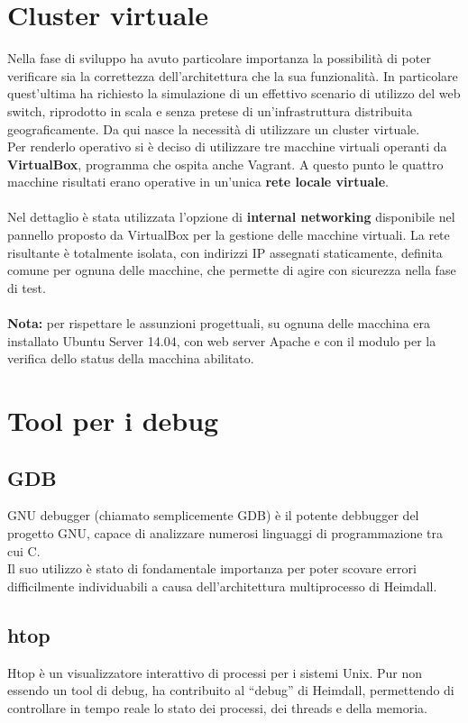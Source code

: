 \documentclass[italian]{tktltiki2}
\begin{document}
\section{Cluster virtuale}
Nella fase di sviluppo ha avuto particolare importanza la possibilità di poter verificare sia la correttezza dell'architettura che la sua funzionalità. In particolare quest'ultima ha richiesto la simulazione di un effettivo scenario di utilizzo del web switch, riprodotto in scala e senza pretese di un'infrastruttura distribuita geograficamente. Da qui nasce la necessità di utilizzare un cluster virtuale.\\
Per renderlo operativo si è deciso di utilizzare tre macchine virtuali operanti da \textbf{VirtualBox}\cite{virtualbox}, programma che ospita anche Vagrant. A questo punto le quattro macchine risultati erano operative in un'unica \textbf{rete locale virtuale}. \\\\
Nel dettaglio è stata utilizzata l'opzione di \textbf{internal networking} disponibile nel pannello proposto da VirtualBox per la gestione delle macchine virtuali. La rete risultante è totalmente isolata, con indirizzi IP assegnati staticamente, definita comune per ognuna delle macchine, che permette di agire con sicurezza nella fase di test. \\\\
\textbf{Nota: } per rispettare le assunzioni progettuali, su ognuna delle macchina era installato Ubuntu Server 14.04, con web server Apache e con il modulo per la verifica dello status della macchina abilitato.

\newpage
\section{Tool per i debug}
\subsection{GDB}
GNU debugger (chiamato semplicemente GDB)\cite{gdb} è il potente debbugger del progetto GNU, capace di analizzare numerosi linguaggi di programmazione tra cui C.
\\
Il suo utilizzo è stato di fondamentale importanza per poter scovare errori difficilmente individuabili a causa dell'architettura multiprocesso di Heimdall.

\subsection{htop}
Htop\cite{htop} è un visualizzatore interattivo di processi per i sistemi Unix. Pur non essendo un tool di debug, ha contribuito al ``debug'' di Heimdall, permettendo di controllare in tempo reale lo stato dei processi, dei threads e della memoria.
\end{document}
